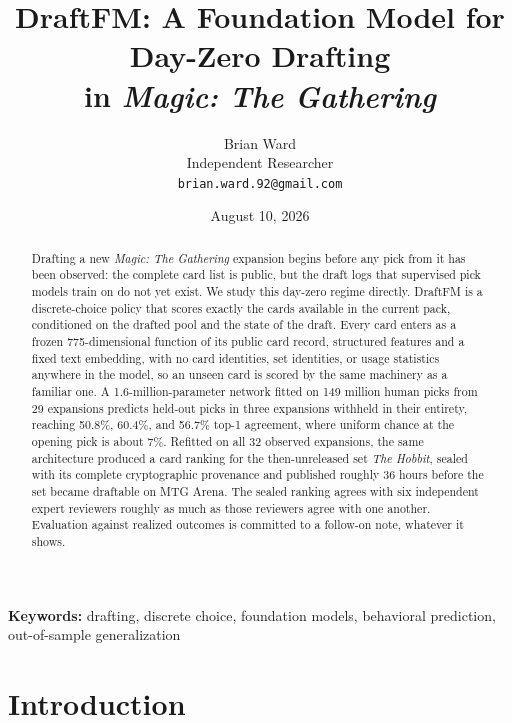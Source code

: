 \documentclass[11pt]{article}
\numberwithin{equation}{section}
\begin{document}
\title{DraftFM: A Foundation Model for Day-Zero Drafting\\
in \emph{Magic: The Gathering}}
\author{Brian Ward\\
\addlinespace
  {\small Independent Researcher}\\
  {\small\texttt{brian.ward.92@gmail.com}}}
\date{August 10, 2026}
\maketitle

\begin{abstract}
Drafting a new \emph{Magic: The Gathering} expansion begins before any pick
from it has been observed: the complete card list is public, but the draft
logs that supervised pick models train on do not yet exist. We study this
day-zero regime directly. DraftFM is a discrete-choice policy that scores
exactly the cards available in the current pack, conditioned on the drafted
pool and the state of the draft. Every card enters as a frozen
775-dimensional function of its public card record, structured features and
a fixed text embedding, with no card identities, set identities, or usage
statistics anywhere in the model, so an unseen card is scored by the same
machinery as a familiar one. A 1.6-million-parameter network fitted on 149
million human picks from 29 expansions predicts held-out picks in three
expansions withheld in their entirety, reaching 50.8\%, 60.4\%, and 56.7\%
top-1 agreement, where uniform chance at the opening pick is about 7\%.
Refitted on all 32 observed expansions, the same architecture produced a
card ranking for the then-unreleased set \emph{The Hobbit}, sealed with its
complete cryptographic provenance and published roughly 36 hours before the
set became draftable on MTG Arena. The sealed ranking agrees with six
independent expert reviewers roughly as much as those reviewers agree with
one another. Evaluation against realized outcomes is committed to a
follow-on note, whatever it shows.
\end{abstract}

\medskip
\noindent\textbf{Keywords:} drafting, discrete choice, foundation models,
behavioral prediction, out-of-sample generalization

\newpage

\tableofcontents

\newpage

\section{Introduction}
\label{sec:introduction}
\end{document}
